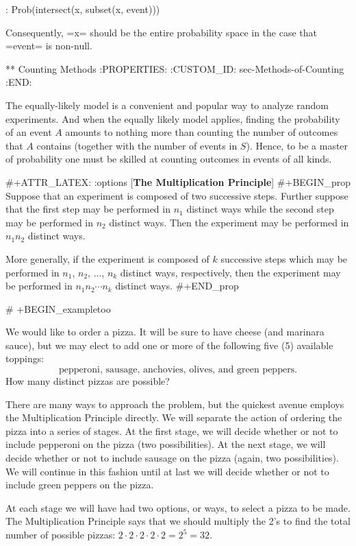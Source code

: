 : Prob(intersect(x, subset(x, event)))

Consequently, =x= should be the entire probability space in the case
that =event= is non-null.

** Counting Methods
:PROPERTIES:
:CUSTOM_ID: sec-Methods-of-Counting
:END:

The equally-likely model is a convenient and popular way to analyze
random experiments. And when the equally likely model applies, finding
the probability of an event \(A\) amounts to nothing more than
counting the number of outcomes that \(A\) contains (together with the
number of events in \(S\)). Hence, to be a master of probability one
must be skilled at counting outcomes in events of all kinds.

#+ATTR_LATEX: :options [\textbf{The Multiplication Principle}]
#+BEGIN_prop
Suppose that an experiment is composed of two successive
steps. Further suppose that the first step may be performed in
\(n_{1}\) distinct ways while the second step may be performed in
\(n_{2}\) distinct ways. Then the experiment may be performed in
\(n_{1}n_{2}\) distinct ways.

More generally, if the experiment is composed of \(k\) successive
steps which may be performed in \(n_{1}\), \(n_{2}\), ..., \(n_{k}\)
distinct ways, respectively, then the experiment may be performed in
\(n_{1} n_{2} \cdots n_{k}\) distinct ways.
#+END_prop

# +BEGIN_exampletoo

We would like to order a pizza. It will be sure to have cheese (and
marinara sauce), but we may elect to add one or more of the following
five (5) available toppings: \[ \mbox{pepperoni, sausage, anchovies,
olives, and green peppers.}  \] How many distinct pizzas are possible?

There are many ways to approach the problem, but the quickest avenue
employs the Multiplication Principle directly. We will separate the
action of ordering the pizza into a series of stages. At the first
stage, we will decide whether or not to include pepperoni on the pizza
(two possibilities). At the next stage, we will decide whether or not
to include sausage on the pizza (again, two possibilities). We will
continue in this fashion until at last we will decide whether or not
to include green peppers on the pizza.

At each stage we will have had two options, or ways, to select a pizza
to be made. The Multiplication Principle says that we should multiply
the 2's to find the total number of possible pizzas: \(2 \cdot 2 \cdot
2 \cdot 2 \cdot 2 = 2^{5} = 32\).

